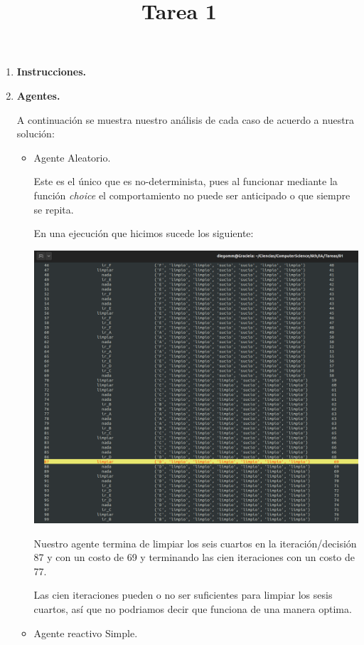 \documentclass[14pt,letterpaper]{article}
\title{Tarea 1}
\author{}
\date{}
\begin{document}
\ttfamily
\maketitle
\rmfamily
\begin{enumerate}
\item {\bf Instrucciones.}
  
  \item {\bf Agentes.}

    A continuación se muestra nuestro análisis de
    cada caso de acuerdo a nuestra solución:
    
    \begin{itemize}
    \item Agente Aleatorio.

      Este es el único que es no-determinista, pues
      al funcionar mediante la función {\it choice}
      el comportamiento no puede ser anticipado o
      que siempre se repita.

      En una ejecución que hicimos sucede los siguiente:

      \begin{centering}
        \includegraphics[scale=.3]{aleatorio}
      \end{centering}
      
      Nuestro agente termina de limpiar
      los seis cuartos en la iteración/decisión 87
      y con un costo de 69 y terminando las cien
      iteraciones con un costo de 77.

      Las cien iteraciones pueden o no ser suficientes
      para limpiar los sesis cuartos, así que no podriamos decir
      que funciona de una manera optima.
      \newpage
    \item Agente reactivo Simple.


\end{itemize}
\end{enumerate}
\end{document}
